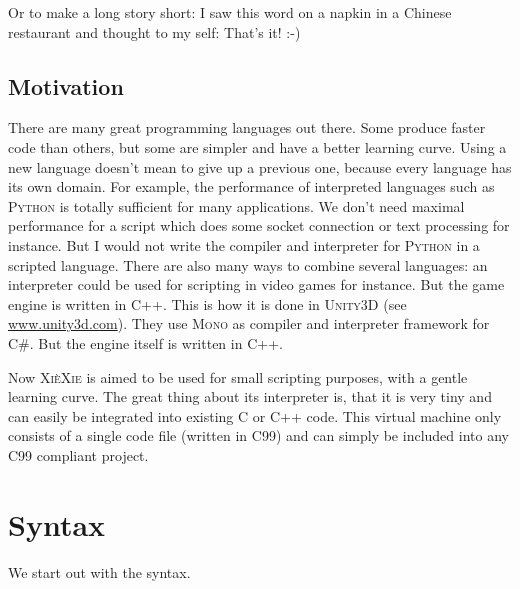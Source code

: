 \documentclass{report}
\def\xiexie{\textsc{Xi\`eXie}\xspace}
\def\cpp{\textsc{C++}\xspace}
\def\python{\textsc{Python}\xspace}
\begin{document}
Or to make a long story short: I saw this word on a napkin in a Chinese restaurant and thought to my self: That's it! :-)



\section{Motivation}

There are many great programming languages out there. Some produce faster code than others, but some
are simpler and have a better learning curve. Using a new language doesn't mean to give up a previous one,
because every language has its own domain. For example, the performance of interpreted languages such as \python
is totally sufficient for many applications. We don't need maximal performance for a script which does some
socket connection or text processing for instance.
But I would not write the compiler and interpreter for \python in a scripted language.
There are also many ways to combine several languages: an interpreter could be used for scripting in video games
for instance. But the game engine is written in \cpp.
This is how it is done in \textsc{Unity3D} (see \href{http://www.unity3d.com/}{www.unity3d.com}).
They use \textsc{Mono} as compiler and interpreter framework for \textsc{C\#}. But the engine itself is written in \cpp.

Now \xiexie is aimed to be used for small scripting purposes, with a gentle learning curve.
The great thing about its interpreter is, that it is very tiny and can easily be integrated into
existing \textsc{C} or \cpp code. This virtual machine only consists of a single code file (written in \textsc{C99})
and can simply be included into any \textsc{C99} compliant project.



\chapter{Syntax}

We start out with the syntax.


\end{document}
